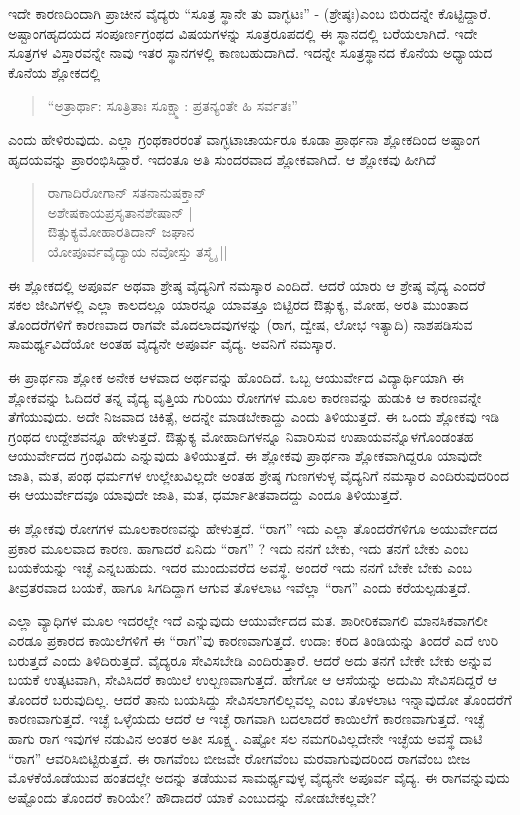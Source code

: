 ಇದೇ ಕಾರಣದಿಂದಾಗಿ ಪ್ರಾಚೀನ ವೈದ್ಯರು “ಸೂತ್ರ ಸ್ಥಾನೇ ತು ವಾಗ್ಭಟಃ” - (ಶ್ರೇಷ್ಠಃ)ಎಂಬ ಬಿರುದನ್ನೇ ಕೊಟ್ಟಿದ್ದಾರೆ. ಅಷ್ಟಾಂಗಹೃದಯದ ಸಂಪೂರ್ಣಗ್ರಂಥದ ವಿಷಯಗಳನ್ನು ಸೂತ್ರರೂಪದಲ್ಲಿ ಈ ಸ್ಥಾನದಲ್ಲಿ ಬರೆಯಲಾಗಿದೆ. ಇದೇ ಸೂತ್ರಗಳ ವಿಸ್ತಾರವನ್ನೇ ನಾವು ಇತರ ಸ್ಥಾನಗಳಲ್ಲಿ ಕಾಣಬಹುದಾಗಿದೆ. ಇದನ್ನೇ ಸೂತ್ರಸ್ಥಾನದ ಕೊನೆಯ ಅಧ್ಯಾಯದ ಕೊನೆಯ ಶ್ಲೋಕದಲ್ಲಿ 
\begin{verse}
“ಅತ್ರಾರ್ಥಾ: ಸೂತ್ರಿತಾಃ ಸೂಕ್ಷ್ಮಾ: ಪ್ರತನ್ಯಂತೇ ಹಿ ಸರ್ವತಃ” 
\end{verse}
ಎಂದು ಹೇಳಿರುವುದು. ಎಲ್ಲಾ ಗ್ರಂಥಕಾರರಂತೆ ವಾಗ್ಭಟಾಚಾರ್ಯರೂ ಕೂಡಾ ಪ್ರಾರ್ಥನಾ ಶ್ಲೋಕದಿಂದ ಅಷ್ಟಾಂಗ ಹೃದಯವನ್ನು ಪ್ರಾರಂಭಿಸಿದ್ದಾರೆ. ಇದಂತೂ ಅತಿ ಸುಂದರವಾದ ಶ್ಲೋಕವಾಗಿದೆ. ಆ ಶ್ಲೋಕವು ಹೀಗಿದೆ \
\begin{verse}
ರಾಗಾದಿರೋಗಾನ್ ಸತನಾನುಷಕ್ತಾನ್\\
ಅಶೇಷಕಾಯಪ್ರಸೃತಾನಶೇಷಾನ್ |\\
ಔತ್ಸುಕ್ಯಮೋಹಾರತಿದಾನ್‍ ಜಘಾನ\\
ಯೋಪೂರ್ವವೈದ್ಯಾಯ ನವೋಸ್ತು ತಸ್ಮೈ ||
\end{verse}
ಈ ಶ್ಲೋಕದಲ್ಲಿ ಅಪೂರ್ವ ಅಥವಾ ಶ್ರೇಷ್ಠ ವೈದ್ಯನಿಗೆ ನಮಸ್ಕಾರ ಎಂದಿದೆ. ಆದರೆ ಯಾರು ಆ ಶ್ರೇಷ್ಠ ವೈದ್ಯ ಎಂದರೆ ಸಕಲ ಜೀವಿಗಳಲ್ಲಿ ಎಲ್ಲಾ ಕಾಲದಲ್ಲೂ ಯಾರನ್ನೂ ಯಾವತ್ತೂ ಬಿಟ್ಟಿರದ ಔತ್ಸುಕ್ಯ, ಮೋಹ, ಅರತಿ ಮುಂತಾದ ತೊಂದರೆಗಳಿಗೆ ಕಾರಣವಾದ ರಾಗವೇ ಮೊದಲಾದವುಗಳನ್ನು (ರಾಗ, ದ್ವೇಷ, ಲೋಭ ಇತ್ಯಾದಿ) ನಾಶಪಡಿಸುವ ಸಾಮರ್ಥ್ಯವಿದೆಯೋ ಅಂತಹ ವೈದ್ಯನೇ ಅಪೂರ್ವ ವೈದ್ಯ. ಅವನಿಗೆ ನಮಸ್ಕಾರ.

ಈ ಪ್ರಾರ್ಥನಾ ಶ್ಲೋಕ ಅನೇಕ ಆಳವಾದ ಅರ್ಥವನ್ನು ಹೊಂದಿದೆ. ಒಬ್ಬ ಆಯುರ್ವೇದ ವಿದ್ಯಾರ್ಥಿಯಾಗಿ  ಈ ಶ್ಲೋಕವನ್ನು ಓದಿದರೆ ತನ್ನ ವೈದ್ಯ ವೃತ್ತಿಯ ಗುರಿಯು ರೋಗಗಳ ಮೂಲ ಕಾರಣವನ್ನು ಹುಡುಕಿ ಆ ಕಾರಣವನ್ನೇ ತೆಗೆಯುವುದು. ಅದೇ ನಿಜವಾದ ಚಿಕಿತ್ಸೆ, ಅದನ್ನೇ ಮಾಡಬೇಕಾದ್ದು ಎಂದು ತಿಳಿಯುತ್ತದೆ. ಈ ಒಂದು ಶ್ಲೋಕವು ಇಡಿ ಗ್ರಂಥದ ಉದ್ದೇಶವನ್ನೂ ಹೇಳುತ್ತದೆ. ಔತ್ಸುಕ್ಯ ಮೋಹಾದಿಗಳನ್ನೂ ನಿವಾರಿಸುವ ಉಪಾಯವನ್ನೊಳಗೊಂಡಂತಹ ಆಯುರ್ವೇದದ ಗ್ರಂಥವಿದು ಎನ್ನುವುದು ತಿಳಿಯುತ್ತದೆ. ಈ ಶ್ಲೋಕವು ಪ್ರಾರ್ಥನಾ ಶ್ಲೋಕವಾಗಿದ್ದರೂ ಯಾವುದೇ ಜಾತಿ, ಮತ, ಪಂಥ ಧರ್ಮಗಳ ಉಲ್ಲೇಖವಿಲ್ಲದೇ ಅಂತಹ ಶ್ರೇಷ್ಠ ಗುಣಗಳುಳ್ಳ ವೈದ್ಯನಿಗೆ ನಮಸ್ಕಾರ ಎಂದಿರುವುದರಿಂದ ಈ ಆಯುರ್ವೇದವೂ ಯಾವುದೇ ಜಾತಿ, ಮತ, ಧರ್ಮಾತೀತವಾದದ್ದು ಎಂದೂ ತಿಳಿಯುತ್ತದೆ.

ಈ ಶ್ಲೋಕವು ರೋಗಗಳ ಮೂಲಕಾರಣವನ್ನು ಹೇಳುತ್ತದೆ. “ರಾಗ” ಇದು ಎಲ್ಲಾ ತೊಂದರೆಗಳಿಗೂ ಅಯುರ್ವೇದದ ಪ್ರಕಾರ ಮೂಲವಾದ ಕಾರಣ. ಹಾಗಾದರೆ ಏನಿದು “ರಾಗ” ? ಇದು ನನಗೆ ಬೇಕು, ಇದು ತನಗೆ ಬೇಕು ಎಂಬ ಬಯಕೆಯನ್ನು ಇಚ್ಛೆ ಎನ್ನಬಹುದು. ಇದರ ಮುಂದುವರೆದ ಅವಸ್ಥೆ. ಅಂದರೆ ಇದು ನನಗೆ ಬೇಕೇ ಬೇಕು ಎಂಬ ತೀವ್ರತರವಾದ ಬಯಕೆ, ಹಾಗೂ ಸಿಗದಿದ್ದಾಗ ಆಗುವ ತೊಳಲಾಟ ಇವೆಲ್ಲಾ “ರಾಗ” ಎಂದು ಕರೆಯಲ್ಪಡುತ್ತದೆ.

ಎಲ್ಲಾ ವ್ಯಾಧಿಗಳ ಮೂಲ ಇದರಲ್ಲೇ ಇದೆ ಎನ್ನುವುದು ಆಯುರ್ವೇದದ ಮತ. ಶಾರೀರಿಕವಾಗಲಿ ಮಾನಸಿಕವಾಗಲೀ ಎರಡೂ ಪ್ರಕಾರದ ಕಾಯಿಲೆಗಳಿಗೆ ಈ “ರಾಗ”ವು ಕಾರಣವಾಗುತ್ತದೆ. ಉದಾ: ಕರಿದ ತಿಂಡಿಯನ್ನು ತಿಂದರೆ ಎದೆ ಉರಿ ಬರುತ್ತದೆ ಎಂದು ತಿಳಿದಿರುತ್ತದೆ. ವೈದ್ಯರೂ ಸೇವಿಸಬೇಡಿ ಎಂದಿರುತ್ತಾರೆ. ಆದರೆ ಅದು ತನಗೆ ಬೇಕೇ ಬೇಕು ಅನ್ನುವ ಬಯಕೆ ಉತ್ಕಟವಾಗಿ, ಸೇವಿಸಿದರೆ ಕಾಯಿಲೆ ಉಲ್ಬಣವಾಗುತ್ತದೆ. ಹೇಗೋ ಆ ಆಸೆಯನ್ನು ಅದುಮಿ ಸೇವಿಸದಿದ್ದರೆ ಆ ತೊಂದರೆ ಬರುವುದಿಲ್ಲ. ಆದರೆ ತಾನು ಬಯಸಿದ್ದು ಸೇವಿಸಲಾಗಲಿಲ್ಲವಲ್ಲ ಎಂಬ ತೊಳಲಾಟ ಇನ್ನಾವುದೋ ತೊಂದರೆಗೆ  ಕಾರಣವಾಗುತ್ತದೆ. ಇಚ್ಛೆ ಒಳ್ಳೆಯದು ಆದರೆ ಆ ಇಚ್ಛೆ ರಾಗವಾಗಿ ಬದಲಾದರೆ ಕಾಯಿಲೆಗೆ ಕಾರಣವಾಗುತ್ತದೆ. ಇಚ್ಛೆ ಹಾಗು ರಾಗ ಇವುಗಳ ನಡುವಿನ ಅಂತರ ಅತೀ ಸೂಕ್ಷ್ಮ. ಎಷ್ಟೋ ಸಲ ನಮಗರಿವಿಲ್ಲದೇನೇ ಇಚ್ಛೆಯ ಅವಸ್ಥೆ ದಾಟಿ “ರಾಗ” ಆವರಿಸಿಬಿಟ್ಟಿರುತ್ತದೆ. ಈ ರಾಗವೆಂಬ ಬೀಜವೇ ರೋಗವೆಂಬ ಮರವಾಗುವುದರಿಂದ ರಾಗವೆಂಬ ಬೀಜ ಮೊಳಕೆಯೊಡೆಯುವ ಹಂತದಲ್ಲೇ ಅದನ್ನು ತಡೆಯುವ ಸಾಮರ್ಥ್ಯವುಳ್ಳ ವೈದ್ಯನೇ ಅಪೂರ್ವ ವೈದ್ಯ. ಈ ರಾಗವನ್ನುವುದು ಅಷ್ಟೊಂದು ತೊಂದರೆ ಕಾರಿಯೇ? ಹೌದಾದರೆ ಯಾಕೆ ಎಂಬುದನ್ನು ನೋಡಬೇಕಲ್ಲವೇ?

